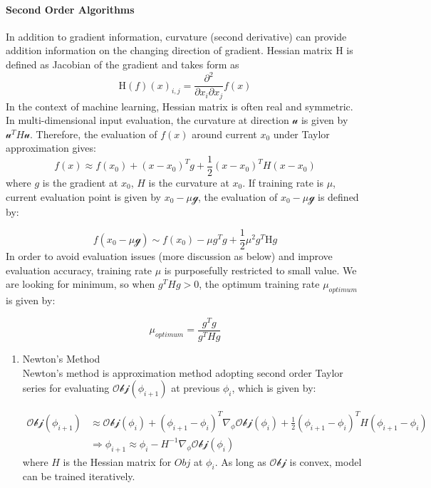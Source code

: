 \paragraph{Second Order Algorithms}
In addition to gradient information, curvature (second derivative) can provide addition information on the changing direction of gradient. Hessian matrix $\mathrm{H}$ is defined as Jacobian of the gradient and takes form as 
\begin{equation}
    \mathrm{H}(f)(x)_{i,j} = \frac{\partial^2}{\partial x_i \partial x_j}f(x)
\end{equation}
In the context of machine learning, Hessian matrix is often real and symmetric. In multi-dimensional input evaluation, the curvature at direction $\mathcal{u}$ is given by $\mathcal{u}^TH\mathcal{u}$. Therefore, the evaluation of $f(x)$ around current $x_0$ under Taylor approximation gives:
\begin{equation}
    \label{eq:TaylorEvaluation}
    f(x) \approx f(x_0)+(x-x_0)^Tg+\frac{1}{2}(x-x_0)^TH(x-x_0)
\end{equation}
where $g$ is the gradient at $x_0$, $H$ is the curvature at $x_0$. If training rate is $\mu$, current evaluation point is given by $x_0-\mu\mathcal{g}$, the evaluation of $x_0-\mu\mathcal{g}$ is defined by:

\begin{equation}
\label{eq:TaylorEvaStep}
    f(x_0-\mu\mathcal{g}) \sim f(x_0) - \mu g^Tg + \frac{1}{2}\mu^2g^T\mathrm{H}g
\end{equation}
In order to avoid evaluation issues (more discussion as below) and improve evaluation accuracy, training rate $\mu$ is purposefully restricted to small value. We are looking for minimum, so when $g^THg > 0$, the optimum training rate $\mu_{optimum}$ is given by:

\begin{equation}
    \mu_{optimum} = \frac{g^Tg}{g^THg}
\end{equation}

\begin{enumerate}
    \item Newton's Method\\
Newton's method is approximation method adopting second order Taylor series for evaluating $\mathcal{Obj}(\phi_{i+1})$ at previous $\phi_i$, which is given by:

\begin{align}
    \mathcal{Obj}(\phi_{i+1}) & \approx   
    \mathcal{Obj}(\phi_{i}) + (\phi_{i+1}-\phi_i)^T \nabla_{\phi}\mathcal{Obj}(\phi_{i}) 
    + \frac{1}{2}(\phi_{i+1}-\phi_i)^T H (\phi_{i+1}-\phi_i) \\
    & \Rightarrow  
    \phi_{i+1} \approx \phi_i - H^{-1} \nabla_{\phi}\mathcal{Obj}(\phi_i)
\end{align}
where $H$ is the Hessian matrix for $Obj$ at $\phi_i$. As long as $\mathcal{Obj}$ is convex, model can be trained iteratively. 
\end{enumerate}